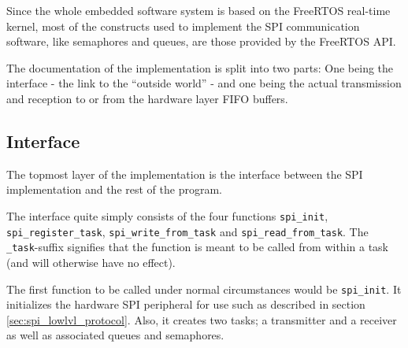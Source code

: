 Since the whole embedded software system is based on the FreeRTOS real-time kernel, most of the constructs used to implement the SPI communication software, like semaphores and queues, are those provided by the FreeRTOS API.

The documentation of the implementation is split into two parts: One being the interface - the link to the ``outside world'' - and one being the actual transmission and reception to or from the hardware layer FIFO buffers.



\subsection{Interface}
The topmost layer of the implementation is the interface between the SPI implementation and the rest of the program.

The interface quite simply consists of the four functions \texttt{spi\_init}, \texttt{spi\_register\_task}, \texttt{spi\_write\_from\_task} and \texttt{spi\_read\_from\_task}. The \texttt{\_task}-suffix signifies that the function is meant to be called from within a task (and will otherwise have no effect).

The first function to be called under normal circumstances would be \texttt{spi\_init}. It initializes the hardware SPI peripheral for use such as described in section \ref{sec:spi_lowlvl_protocol}. Also, it creates two tasks; a transmitter and a receiver as well as associated queues and semaphores.


